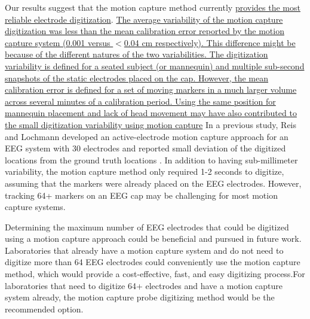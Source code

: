 \documentclass[../thesis_seyed.tex]{subfiles}
\begin{document}
Our results suggest that the motion capture method currently \ul{provides the most reliable electrode digitization}. \ul{The average variability of the motion capture digitization was less than the mean calibration error reported by the motion capture system (0.001 versus $<$0.04 cm respectively). This difference might be because of the different natures of the two variabilities. The digitization variability is defined for a seated subject (or mannequin) and multiple sub-second snapshots of the static electrodes placed on the cap. However, the mean calibration error is defined for a set of moving markers in a much larger volume across several minutes of a calibration period. Using the same position for mannequin placement and lack of head movement may have also contributed to the small digitization variability using motion capture} In a previous study, Reis and Lochmann developed an active-electrode motion capture approach for an EEG system with 30 electrodes and reported small deviation of the digitized locations from the ground truth locations \cite{Reis2015-lt}. 
In addition to having sub-millimeter variability, the motion capture method only required 1-2 seconds to digitize, assuming that the markers were already placed on the EEG electrodes. However, tracking 64+ markers on an EEG cap may be challenging for most motion capture systems. Determining the maximum number of EEG electrodes that could be digitized using a motion capture approach could be beneficial and pursued in future work. Laboratories that already have a motion capture system and do not need to digitize more than 64 EEG electrodes could conveniently use the motion capture method, which would provide a cost-effective, fast, and easy digitizing process.For laboratories that need to digitize 64+ electrodes and have a motion capture system already, the motion capture probe digitizing method would be the recommended option.
\end{document}
